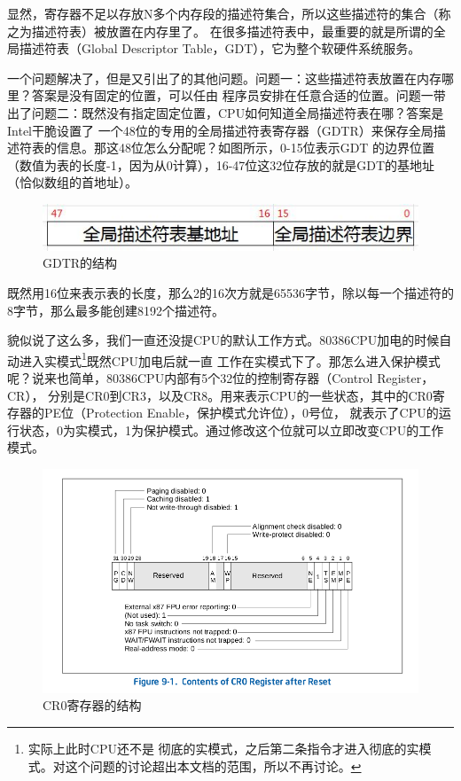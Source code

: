  \par 显然，寄存器不足以存放N多个内存段的描述符集合，所以这些描述符的集合（称之为描述符表）被放置在内存里了。\allowbreak
 在很多描述符表中，最重要的就是所谓的全局描述符表（Global Descriptor Table，GDT），它为整个软硬件系统服务。

 \par 一个问题解决了，但是又引出了的其他问题。问题一：这些描述符表放置在内存哪里？答案是没有固定的位置，可以任由\allowbreak
 程序员安排在任意合适的位置。问题一带出了问题二：既然没有指定固定位置，CPU如何知道全局描述符表在哪？答案是Intel干脆设置了\allowbreak
 一个48位的专用的全局描述符表寄存器（GDTR）来保存全局描述符表的信息。那这48位怎么分配呢？如图所示，0-15位表示GDT\allowbreak
 的边界位置（数值为表的长度-1，因为从0计算），16-47位这32位存放的就是GDT的基地址（恰似数组的首地址）。

\begin{figure}[H]
      \centering
      \includegraphics[scale=0.5]{picture/chapt6/gdtr.png}
      \caption{GDTR的结构}
\end{figure}

\par 既然用16位来表示表的长度，那么2的16次方就是65536字节，除以每一个描述符的8字节，那么最多能创建8192个描述符。

\par 貌似说了这么多，我们一直还没提CPU的默认工作方式。80386CPU加电的时候自动进入实模式\footnote{实际上此时CPU还不是\allowbreak
彻底的实模式，之后第二条指令才进入彻底的实模式。对这个问题的讨论超出本文档的范围，所以不再讨论。}既然CPU加电后就一直\allowbreak
工作在实模式下了。那怎么进入保护模式呢？说来也简单，80386CPU内部有5个32位的控制寄存器（Control Register，CR），\allowbreak
分别是CR0到CR3，以及CR8。用来表示CPU的一些状态，其中的CR0寄存器的PE位（Protection Enable，保护模式允许位），0号位，\allowbreak
就表示了CPU的运行状态，0为实模式，1为保护模式。通过修改这个位就可以立即改变CPU的工作模式。

\begin{figure}[H]
      \centering
      \includegraphics[scale=0.5]{picture/chapt6/cr0.png}
      \caption{CR0寄存器的结构}
\end{figure}

